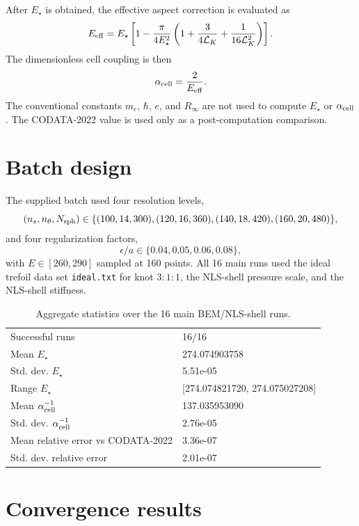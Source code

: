 \documentclass[11pt]{article}
\newcommand{\LK}{\mathcal L_K}
\newcommand{\Estar}{E_\star}
\newcommand{\Eeff}{E_{\rm eff}}
\newcommand{\alphacell}{\alpha_{\rm cell}}
\begin{document}
After \(\Estar\) is obtained, the effective aspect correction is evaluated as
\begin{equation}
\Eeff
=
\Estar
\left[
1-
\frac{\pi}{4\Estar^2}
\left(
1+\frac{3}{4\LK}+\frac{1}{16\LK^2}
\right)
\right].
\label{eq:Eeff}
\end{equation}
The dimensionless cell coupling is then
\begin{equation}
\alphacell=\frac{2}{\Eeff}.
\label{eq:alpha}
\end{equation}
The conventional constants \(m_e\), \(\hbar\), \(e\), and \(R_\infty\) are not used to compute \(\Estar\) or \(\alphacell\). The CODATA-2022 value is used only as a post-computation comparison.

\section{Batch design}

The supplied batch used four resolution levels,
\[
(n_s,n_\theta,N_{\rm sph})\in\{(100,14,300),(120,16,360),(140,18,420),(160,20,480)\},
\]
and four regularization factors,
\[
\epsilon/a\in\{0.04,0.05,0.06,0.08\},
\]
with \(E\in[260,290]\) sampled at 160 points. All 16 main runs used the ideal trefoil data set \texttt{ideal.txt} for knot \(3:1:1\), the NLS-shell pressure scale, and the NLS-shell stiffness.


\begin{table}[h]
\centering
\caption{Aggregate statistics over the 16 main BEM/NLS-shell runs.}
\begin{tabular}{@{}ll@{}}
\toprule
Successful runs & 16/16 \\
Mean $E_\star$ & 274.074903758 \\
Std. dev. $E_\star$ & 5.51e-05 \\
Range $E_\star$ & [274.074821720, 274.075027208] \\
Mean $\alpha_{\rm cell}^{-1}$ & 137.035953090 \\
Std. dev. $\alpha_{\rm cell}^{-1}$ & 2.76e-05 \\
Mean relative error vs CODATA-2022 & 3.36e-07 \\
Std. dev. relative error & 2.01e-07 \\
\bottomrule
\end{tabular}
\label{tab:aggregate}
\end{table}


\section{Convergence results}
\end{document}
